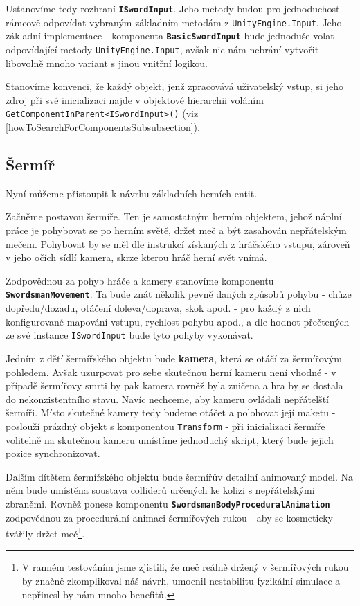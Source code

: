 Ustanovíme tedy rozhraní \textbf{\texttt{ISwordInput}}. Jeho metody budou pro jednoduchost rámcově odpovídat vybraným základním metodám z \texttt{UnityEngine.Input}. Jeho základní implementace - komponenta \textbf{\texttt{BasicSwordInput}} bude jednoduše volat odpovídající metody \texttt{UnityEngine.Input}, avšak nic nám nebrání vytvořit libovolně mnoho variant s jinou vnitřní logikou. 

Stanovíme konvenci, že každý objekt, jenž zpracovává uživatelský vstup, si jeho zdroj při své inicializaci najde v objektové hierarchii voláním \texttt{GetComponentInParent<ISwordInput>()} (viz \ref{howToSearchForComponentsSubsubsection}).


\subsection{Šermíř}

Nyní můžeme přistoupit k návrhu základních herních entit. 

Začněme postavou šermíře. Ten je samostatným herním objektem, jehož náplní práce je pohybovat se po herním světě, držet meč a být zasahován nepřátelským mečem. Pohybovat by se měl dle instrukcí získaných z hráčského vstupu, zároveň v jeho očích sídlí kamera, skrze kterou hráč herní svět vnímá.

Zodpovědnou za pohyb hráče a kamery stanovíme komponentu \textbf{\texttt{SwordsmanMovement}}. Ta bude znát několik pevně daných způsobů pohybu - chůze dopředu/dozadu, otáčení doleva/doprava, skok apod. - pro každý z nich konfigurované mapování vstupu, rychlost pohybu apod., a dle hodnot přečtených ze své instance \texttt{ISwordInput} bude tyto pohyby vykonávat. 

Jedním z dětí šermířského objektu bude \textbf{kamera}, která se otáčí za šermířovým pohledem. Avšak uzurpovat pro sebe skutečnou herní kameru není vhodné - v případě šermířovy smrti by pak kamera rovněž byla zničena a hra by se dostala do nekonzistentního stavu. Navíc nechceme, aby kameru ovládali nepřátelští šermíři. Místo skutečné kamery tedy budeme otáčet a polohovat její maketu - poslouží prázdný objekt s komponentou \texttt{Transform} - při inicializaci šermíře volitelně na skutečnou kameru umístíme jednoduchý skript, který bude jejich pozice synchronizovat.

Dalším dítětem šermířského objektu bude šermířův detailní animovaný model. Na něm bude umístěna soustava colliderů určených ke kolizi s nepřátelskými zbraněmi. Rovněž ponese komponentu \textbf{\texttt{SwordsmanBodyProceduralAnimation}} zodpovědnou za procedurální animaci šermířových rukou - aby se kosmeticky tvářily držet meč\footnote{V ranném testováním jsme zjistili, že meč reálně držený v šermířových rukou by značně zkomplikoval náš návrh, umocnil nestabilitu fyzikální simulace a nepřinesl by nám mnoho benefitů.}.


